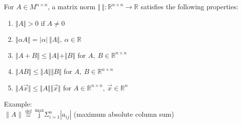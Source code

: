 \documentclass[preview]{standalone} %
\begin{document}
For $A\in M^{n \times n}$, a matrix norm $\Vert\ \Vert: \mathbb{R}^{n \times n} \rightarrow \mathbb{R}$ satisfies the following properties:
\begin{enumerate}
    \item $\Vert A \Vert > 0 \text{ if } A \not = 0$
    \item $\Vert \alpha A \Vert = | \alpha|\ \Vert  A \Vert,\ \alpha \in \mathbb{R}$
    \item $\Vert A + B\Vert \leq \Vert A\Vert + \Vert B\Vert $ for $A,\ B \in \mathbb{R}^{n \times n}$
    \item $\Vert A B\Vert \leq \Vert A\Vert \Vert B\Vert $ for $A,\ B \in \mathbb{R}^{n \times n}$
    \item $\Vert A \vec{x}\Vert \leq \Vert A\Vert \Vert \vec{x}\Vert $ for $A \in \mathbb{R}^{n \times n},\ \vec{x} \in \mathbb{R}^{n}$
\end{enumerate}
Example:\\
$\displaystyle \|A\| \stackrel{\text{def}}{\equiv}\ \stackrel{\text{max}}{\text{j}} \Sigma^{n}_{i=1}|a_{ij}|$ (maximum absolute column sum)
\end{document}
